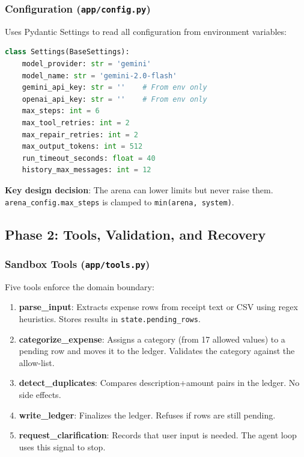 \documentclass[12pt,a4paper]{article}
\begin{document}
\subsubsection{Configuration (\texttt{app/config.py})}

Uses Pydantic Settings to read all configuration from environment variables:
\begin{lstlisting}[language=Python]
class Settings(BaseSettings):
    model_provider: str = 'gemini'
    model_name: str = 'gemini-2.0-flash'
    gemini_api_key: str = ''    # From env only
    openai_api_key: str = ''    # From env only
    max_steps: int = 6
    max_tool_retries: int = 2
    max_repair_retries: int = 2
    max_output_tokens: int = 512
    run_timeout_seconds: float = 40
    history_max_messages: int = 12
\end{lstlisting}

\textbf{Key design decision}: The arena can lower limits but never raise them. \texttt{arena\_config.max\_steps} is clamped to \texttt{min(arena, system)}.

\subsection{Phase 2: Tools, Validation, and Recovery}

\subsubsection{Sandbox Tools (\texttt{app/tools.py})}

Five tools enforce the domain boundary:

\begin{enumerate}
  \item \textbf{parse\_input}: Extracts expense rows from receipt text or CSV using regex heuristics. Stores results in \texttt{state.pending\_rows}.
  \item \textbf{categorize\_expense}: Assigns a category (from 17 allowed values) to a pending row and moves it to the ledger. Validates the category against the allow-list.
  \item \textbf{detect\_duplicates}: Compares description+amount pairs in the ledger. No side effects.
  \item \textbf{write\_ledger}: Finalizes the ledger. Refuses if rows are still pending.
  \item \textbf{request\_clarification}: Records that user input is needed. The agent loop uses this signal to stop.
\end{enumerate}
\end{document}
